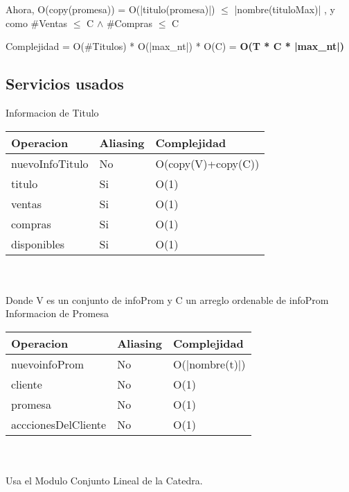 		Ahora, O(copy(promesa)) = O(|titulo(promesa)|) $\leq$ |nombre(tituloMax)| , y como
		\#Ventas $\leq$ C $\wedge$  \#Compras $\leq$ C

		Complejidad = O(\#Titulos) * O(|max\_nt|) * O(C) = \textbf{O(T * C * |max\_nt|)}
 				

	
\subsection{Servicios usados}
	
{\LARGE 	Informacion de Titulo} \\ 
	
\begin{tabular}[c]{|l|l|l|}
		\hline
		Operacion & Aliasing & Complejidad \\
		\hline
		nuevoInfoTitulo & No & O(copy(V)+copy(C)) \\
		\hline
		titulo & Si & O(1) \\
		\hline
		ventas & Si & O(1) \\
		\hline
		compras & Si & O(1) \\
		\hline
		disponibles & Si & O(1) \\
		\hline
	\end{tabular}\\\\
	Donde V es un conjunto de infoProm y C un arreglo ordenable de infoProm \\	
	
	{\LARGE Informacion de Promesa} \\  

\begin{tabular}[c]{|l|l|l|}
		\hline
		Operacion & Aliasing & Complejidad \\
		\hline
		nuevoinfoProm & No & O(|nombre(t)|) \\
		\hline
		cliente & No & O(1) \\
		\hline
		promesa & No & O(1) \\
		\hline
		acccionesDelCliente & No & O(1) \\
		\hline
	\end{tabular}\\\\	
	
	Usa el Modulo {\LARGE Conjunto Lineal} de la Catedra. \\
\newpage
